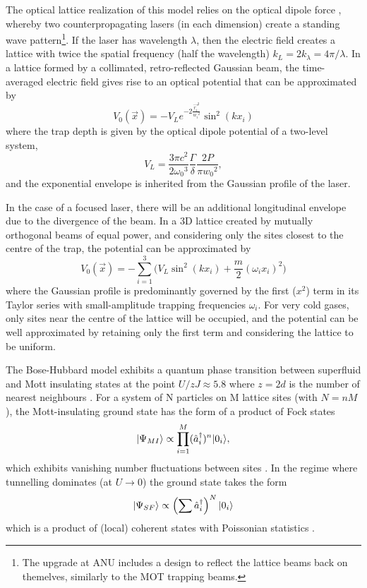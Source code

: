 	The optical lattice realization of this model relies on the optical dipole force \cite{Grimm00}, whereby two counterpropagating lasers (in each dimension) create a standing wave pattern\footnote{The upgrade at ANU includes a design to reflect the lattice beams back on themelves, similarly to the MOT trapping beams.}.
	If the laser has wavelength $\lambda$, then the electric field creates a lattice with twice the spatial frequency (half the wavelength) $k_L = 2k_\lambda = 4\pi/\lambda$.
	In a lattice formed by a collimated, retro-reflected Gaussian beam, the time-averaged electric field gives rise to an optical potential that can be approximated by
	\begin{equation}
		V_0(\vec{x}) = - V_{L} e^{-2\frac{{\vec{r_i}}^2}{{w_i}^2}} \sin^2(k x_i)
	\end{equation}
	where the trap depth is given by the optical dipole potential of a two-level system,
	\begin{equation}
		V_{L} = \frac{3\pi c^2}{2{\omega_0}^3}\frac{\Gamma}{\delta}\frac{2P}{\pi {w_0}^2},
	\end{equation}
	and the exponential envelope is inherited from the Gaussian profile of the laser.
	
	In the case of a focused laser, there will be an additional longitudinal envelope due to the divergence of the beam.
	In a 3D lattice created by mutually orthogonal beams of equal power, and considering only the sites closest to the centre of the trap, the potential can be approximated by 
	\begin{equation}
		V_0(\vec{x}) = -\sum_{i=1}^3\Big( V_{L} \sin^2(k x_i) + \frac{m}{2}(\omega_i x_i)^2\Big)
	\end{equation}
	where the Gaussian profile is predominantly governed by the first ($x^2$) term in its Taylor series with small-amplitude trapping frequencies $\omega_i$.	
	For very cold gases, only sites near the centre of the lattice will be occupied, and the potential can be well approximated by retaining only the first term and considering the lattice to be uniform.

	The Bose-Hubbard model exhibits a quantum phase transition between superfluid and Mott insulating states at the point $U/zJ \approx 5.8$ where $z=2d$ is the number of nearest neighbours \cite{Jaksch98}.
	For a system of N particles on M lattice sites (with $N = nM$), the  Mott-insulating ground state has the form of a product of Fock states
	\begin{equation}
		|\Psi_{MI}\rangle \propto \prod_{i=1}^M (\hat{a}^\dagger_i)^n|0_i\rangle,
	\end{equation}
	which exhibits vanishing number fluctuations between sites \cite{Greiner01}.	
	In the regime where tunnelling dominates (at $U\rightarrow 0$) the ground state takes the form
	\begin{equation}
		|\Psi_{SF}\rangle \propto \left(\sum \hat{a}^\dagger_i\right)^N|0_i\rangle
	\end{equation}
	which is a product of (local) coherent states with Poissonian statistics \cite{Greiner01}.
	
